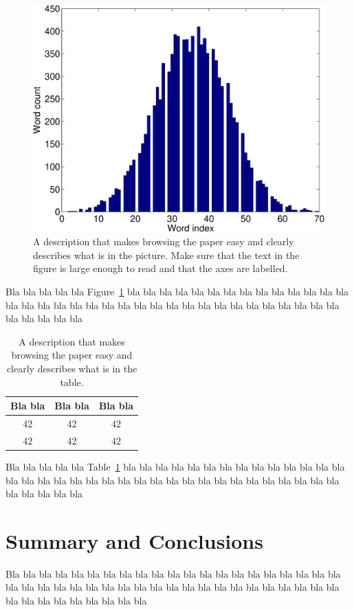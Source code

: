\documentclass[a4paper,12pt]{article}
\begin{document}
\begin{figure}
\centering
\includegraphics[width=0.8\linewidth]{histogram}
\caption{A description that makes browsing the paper easy and clearly 
describes what is in the picture. Make sure that the text in the figure 
is large enough to read and that the axes are labelled.}
\label{fig:histogram}
\end{figure}

Bla bla bla bla bla Figure~\ref{fig:histogram} bla bla bla bla bla bla 
bla bla bla bla bla bla bla bla bla bla bla bla bla bla bla bla bla 
bla bla bla bla bla bla bla bla bla bla bla bla bla bla bla bla bla 

\begin{table}
\begin{center}
\begin{tabular}{|c|c|c|}
\hline
Bla bla & Bla bla & Bla bla \\ \hline
42 & 42 & 42 \\ \hline
42 & 42 & 42 \\ \hline
\end{tabular}
\caption{A description that makes browsing the paper easy and clearly 
describes what is in the table.}
\label{tab:results}
\end{center}
\end{table}

Bla bla bla bla bla Table~\ref{tab:results} bla bla bla bla bla bla 
bla bla bla bla bla bla bla bla bla bla bla bla bla bla bla bla bla 
bla bla bla bla bla bla bla bla bla bla bla bla bla bla bla bla bla 

\section{Summary and Conclusions}
\label{sec:summary}

Bla bla bla bla bla bla bla bla bla bla bla bla bla bla bla bla bla 
bla bla bla bla bla bla bla bla bla bla bla bla bla bla bla bla bla 
bla bla bla bla bla bla bla bla bla bla bla bla bla bla bla bla bla 




\end{document}
